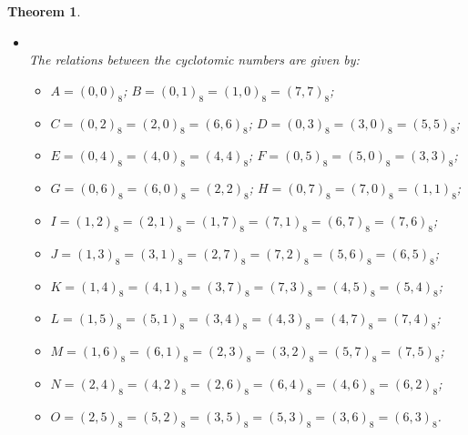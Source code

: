 \documentclass[10pt,a4paper]{amsart}
\newtheorem{theorem}{Theorem}
\begin{document}
\begin{theorem}
\begin{itemize}
$
\begin{array}{|c|c|c|}
\hline
q \equiv 9 \mod 16 &\text{$2$ a quartic residue} &\text{$2$ not a quartic residue}\\
\hline
64A & q-15-2x & q-15-10x-8a \\
64B & q+1+2x-4a+16y & q+1+2x-4a-16b\\
64C & q+1+6x+8a-16y& q+1-2x+16y\\
64D & q+1+2x-4a-16y & q+1+2x-4a-16b\\
64E & q+1-18x & q+1+6x+24a\\
64F & q+1+2x-4a+16y & q+1+2x-4a+16b\\
64G & q+1+6x+8a+16y & q+1-2x-16y\\
64H & q+1+2x-4a-16y & q+1+2x-4a+16b\\
64I & q-7+2x+4a & q-7+2x+4a+16y\\
64J & q-7+2x+4a & q-7+2x+4a-16y\\
64K & q+1-6x+4a+16b & q+1+2x-4a\\
64L & q+1+2x-4a & q+1-6x+4a\\
64M & q+1-6x+4a-16b & q+1+2x-4a\\
64N & q-7-2x-8a & q-7+6x\\
64O & q+1+2x-4a & q+1-6x+4a\\
\hline
\end{array}
$

\item[]\\
The relations between the cyclotomic numbers are given by:
\begin{itemize}
\item[]$A=(0,0)_8$; $B=(0,1)_8 =(1,0)_8 =(7,7)_8$;
\item[]$C=(0,2)_8 =(2,0)_8 =(6,6)_8$; $D=(0,3)_8 =(3,0)_8 =(5,5)_8$; 
\item[]$E=(0,4)_8=(4,0)_8=(4,4)_8$; $F=(0,5)_8 =(5,0)_8 =(3,3)_8$; 
\item[]$G=(0,6)_8 =(6,0)_8 =(2,2)_8$; $H=(0,7)_8 =(7,0)_8 =(1,1)_8$;
\item[]$I=(1,2)_8 =(2,1)_8 =(1,7)_8 =(7,1)_8 =(6,7)_8 =(7,6)_8$;
\item[]$J=(1,3)_8 =(3,1)_8 =(2,7)_8 =(7,2)_8 =(5,6)_8 =(6,5)_8$;
\item[]$K=(1,4)_8 =(4,1)_8 =(3,7)_8 =(7,3)_8 =(4,5)_8 =(5,4)_8$;
\item[]$L=(1,5)_8 =(5,1)_8 =(3,4)_8 =(4,3)_8 =(4,7)_8 =(7,4)_8$;
\item[]$M=(1,6)_8 =(6,1)_8 =(2,3)_8 =(3,2)_8 =(5,7)_8 =(7,5)_8$;
\item[]$N=(2,4)_8 =(4,2)_8 =(2,6)_8 =(6,4)_8 =(4,6)_8 =(6,2)_8$;
\item[]$O=(2,5)_8 =(5,2)_8 =(3,5)_8 =(5,3)_8 =(3,6)_8 =(6,3)_8$.
\end{itemize}


\end{itemize}
\end{theorem}
\end{document}
